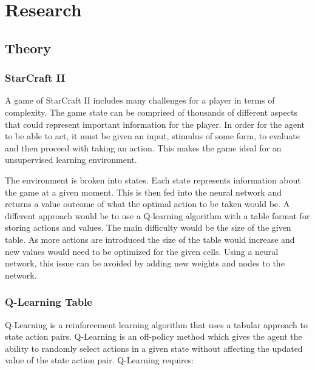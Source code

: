 \chapter{Research}%
\label{research}

\section{Theory}

\subsection{StarCraft II}

A game of StarCraft II includes many challenges for a player in terms of complexity.
The game state can be comprised of thousands of different aspects that could represent
important information for the player. In order for the agent to be able to act,
it must be given an input, stimulus of some form, to evaluate and then proceed with
taking an action. This makes the game ideal for an unsupervised learning environment.

The environment is broken into states. Each state represents information about
the game at a given moment. This is then fed into the neural network and
returns a value outcome of what the optimal action to be taken would be. A
different approach would be to use a Q-learning algorithm with a table format
for storing actions and values. The main difficulty would be the size of the
given table. As more actions are introduced the size of the table would
increase and new values would need to be optimized for the given cells. Using a
neural network, this issue can be avoided by adding new weights and nodes to the
network.

\subsection{Q-Learning Table}

Q-Learning is a reinforcement learning algorithm that uses a tabular approach to
state action pairs. Q-Learning is an off-policy method which gives the agent the
ability to randomly select actions in a given state without affecting the
updated value of the state action pair. Q-Learning requires:

